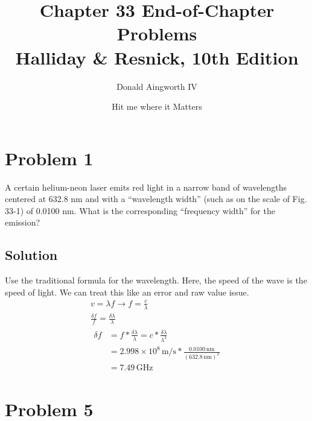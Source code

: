 \documentclass[12pt]{article}
\title{
    Chapter 33 End-of-Chapter Problems
    \\ \small
    Halliday \& Resnick, 10th Edition
}
\author{Donald Aingworth IV}
\date{\small Hit me where it Matters}
\newcommand{\E}[1]{\times 10^{#1}}
\begin{document}

    \maketitle

    \pagebreak
    \section{Problem 1}
        A certain helium-neon laser emits red light in a narrow band of wavelengths centered at 632.8 nm and with a “wavelength width” (such as on the scale of Fig. 33-1) of 0.0100 nm. 
        What is the corresponding “frequency width” for the emission?

        \subsection{Solution}
            Use the traditional formula for the wavelength.
            Here, the speed of the wave is the speed of light.
            We can treat this like an error and raw value issue.
            \begin{gather}
                v   =   \lambda f   \to
                f   =   \frac{c}{\lambda}\\
                \frac{\delta f}{f} = \frac{\delta \lambda}{\lambda}\\
                \begin{align}
                    \delta f    &=  f * \frac{\delta \lambda}{\lambda}
                        =   c * \frac{\delta \lambda}{\lambda^2}\\
                        &=  2.998\E{8}\,\unit{\meter/\second} * \frac{0.0100\,\unit{\nano\meter}}{(632.8\,\unit{\nano\meter})^2}\\
                        &=  \boxed{7.49\,\unit{\giga\hertz}}
                \end{align}
            \end{gather}

    \pagebreak
    \section{Problem 5}
\end{document}
